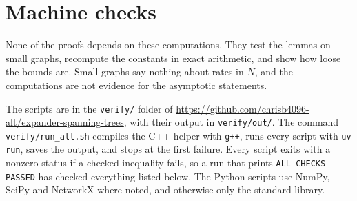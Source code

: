 \section{Machine checks}\label{app:checks}

None of the proofs depends on these computations. They test the lemmas on small graphs, recompute the constants in exact arithmetic, and show how loose the bounds are. Small graphs say nothing about rates in $N$, and the computations are not evidence for the asymptotic statements.

The scripts are in the \texttt{verify/} folder of \url{https://github.com/chrisb4096-alt/expander-spanning-trees}, with their output in \texttt{verify/out/}. The command \texttt{verify/run\_all.sh} compiles the C++ helper with \texttt{g++}, runs every script with \texttt{uv run}, saves the output, and stops at the first failure. Every script exits with a nonzero status if a checked inequality fails, so a run that prints \texttt{ALL CHECKS PASSED} has checked everything listed below. The Python scripts use NumPy, SciPy and NetworkX where noted, and otherwise only the standard library.

